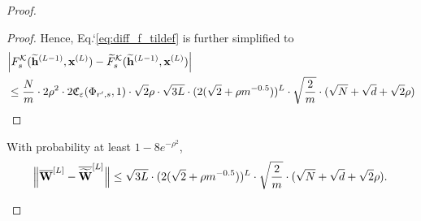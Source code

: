 \begin{claim}
\begin{proof}
\begin{proof}
					Hence, Eq.`\ref{eq:diff_f_tildef} is further simplified to
					\begin{align*}
						&\abs{F^{\mathcal{K}}_s(\widetilde{\mathbf{h}}^{(L-1)}, \mathbf{x}^{(L)}) - \widetilde{F}^{\mathcal{K}}_s(\widetilde{\mathbf{h}}^{(L-1)}, \mathbf{x}^{(L)})} \\&
						\le \frac{N}{m} \cdot 2\rho^2 \cdot 2\mathfrak{C}_{\varepsilon}(\Phi_{r', s}, 1)  \cdot \sqrt{2} \rho \cdot \sqrt{3L} \cdot (2 (\sqrt{2} + \rho m^{-0.5}))^{L} \cdot \sqrt{\frac{2}{m}} \cdot   (\sqrt{N} + \sqrt{d} + \sqrt{2}\rho)
					\end{align*}
					
				\end{proof}
				
				\begin{claim}\label{Claimm:change_in_W}
					With probability at least $1-8e^{-\rho^2}$,
					\begin{equation*}
						\norm[2]{\overline{\mathbf{W}}^{[L]} -  \overline{\widetilde{\mathbf{W}}}^{[L]}} \le \sqrt{3L} \cdot (2 (\sqrt{2} + \rho m^{-0.5}))^{L} \cdot \sqrt{\frac{2}{m}} \cdot   (\sqrt{N} + \sqrt{d} + \sqrt{2}\rho).
					\end{equation*}
				\end{claim}
				

\end{proof}
\end{claim}
